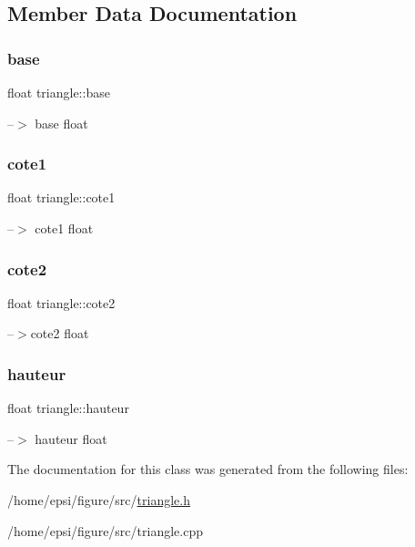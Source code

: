 \subsection{Member Data Documentation}
\mbox{\label{classtriangle_a593133ae58e8fa90c431cfc60733adc5}} 
\subsubsection{\texorpdfstring{base}{base}}
{\footnotesize\ttfamily float triangle\+::base}

--$>$ base  float \mbox{\label{classtriangle_a2263101dafa40aa6c3b7beb79e93f9d3}} 
\subsubsection{\texorpdfstring{cote1}{cote1}}
{\footnotesize\ttfamily float triangle\+::cote1}

--$>$ cote1  float \mbox{\label{classtriangle_a41540d6c2e1bcb076b93ca83fc1032a3}} 
\subsubsection{\texorpdfstring{cote2}{cote2}}
{\footnotesize\ttfamily float triangle\+::cote2}

--$>$cote2  float \mbox{\label{classtriangle_ae42cf8cc51203613bb6e2f6d5628763c}} 
\subsubsection{\texorpdfstring{hauteur}{hauteur}}
{\footnotesize\ttfamily float triangle\+::hauteur}

--$>$ hauteur  float 

The documentation for this class was generated from the following files\+:\begin{DoxyCompactItemize}
\item 
/home/epsi/figure/src/\hyperlink{triangle_8h}{triangle.\+h}\item 
/home/epsi/figure/src/triangle.\+cpp\end{DoxyCompactItemize}
